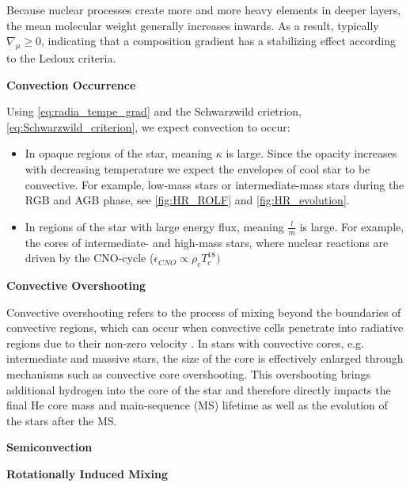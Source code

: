 Because nuclear processes create more and more heavy elements in deeper layers, the mean molecular weight generally increases inwards. As a result, typically $\nabla_{\mu} \geq 0$, indicating that a composition gradient has a stabilizing effect according to the Ledoux criteria. 

{\bf Convection Occurrence}

Using \eqref{eq:radia_tempe_grad} and the Schwarzwild crietrion, \eqref{eq:Schwarzwild_criterion}, we expect convection to occur:
\begin{itemize}
    \item In opaque regions of the star, meaning $\kappa$ is large. Since the opacity increases with decreasing temperature \citep{pols2011stellar} we expect the envelopes of cool star to be convective. For example, low-mass stars or intermediate-mass stars during the RGB and AGB phase, see \cref{fig:HR_ROLF} and \cref{fig:HR_evolution}.
    \item In regions of the star with large energy flux, meaning $\frac{l}{m}$ is large. For example, the cores of intermediate- and high-mass stars, where nuclear reactions are driven by the CNO-cycle ($\epsilon_{CNO} \propto \rho_c T_{c}^{18})$
\end{itemize}







{\bf Convective Overshooting}

Convective overshooting refers to the process of mixing beyond the boundaries of convective regions, which can occur when convective cells penetrate into radiative regions due to their non-zero velocity \citep{alongi1993evolutionary,brott2011rotating,schootemeijer2019constraining}. In stars with convective cores, e.g. intermediate and massive stars, the size of the core is effectively enlarged through mechanisms such as convective core overshooting. This overshooting brings additional hydrogen into the core of the star and therefore directly impacts the final He core mass and main-sequence (MS) lifetime as well as the evolution of the stars after the MS.

{\bf Semiconvection}

{\bf Rotationally Induced Mixing}
